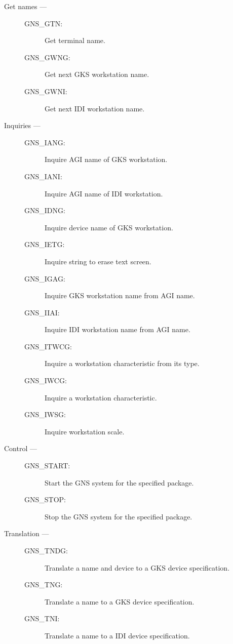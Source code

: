 \begin{description}

\item [Get names ---]

\begin{description}
\item [GNS\_GTN:]  Get terminal name.
\item [GNS\_GWNG:]  Get next GKS workstation name.
\item [GNS\_GWNI:]  Get next IDI workstation name.
\end{description}

\item [Inquiries ---]

\begin{description}
\item [GNS\_IANG:]  Inquire AGI name of GKS workstation.
\item [GNS\_IANI:]  Inquire AGI name of IDI workstation.
\item [GNS\_IDNG:]  Inquire device name of GKS workstation.
\item [GNS\_IETG:]  Inquire string to erase text screen.
\item [GNS\_IGAG:]  Inquire GKS workstation name from AGI name.
\item [GNS\_IIAI:]  Inquire IDI workstation name from AGI name.
\item [GNS\_ITWCG:]  Inquire a workstation characteristic from its type.
\item [GNS\_IWCG:]  Inquire a workstation characteristic.
\item [GNS\_IWSG:]  Inquire workstation scale.
\end{description}

\item [Control ---]

\begin{description}
\item [GNS\_START:]  Start the GNS system for the specified package.
\item [GNS\_STOP:]  Stop the GNS system for the specified package.
\end{description}

\item [Translation ---]

\begin{description}
\item [GNS\_TNDG:]  Translate a name and device to a GKS device specification.
\item [GNS\_TNG:]  Translate a name to a GKS device specification.
\item [GNS\_TNI:]  Translate a name to a IDI device specification.
\end{description}

\end{description}

